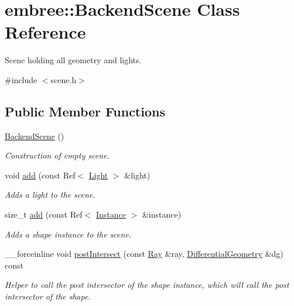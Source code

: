 \hypertarget{classembree_1_1_backend_scene}{
\section{embree::BackendScene Class Reference}
\label{classembree_1_1_backend_scene}
}


Scene holding all geometry and lights.  




{\ttfamily \#include $<$scene.h$>$}

\subsection*{Public Member Functions}
\begin{DoxyCompactItemize}
\item 
\hyperlink{classembree_1_1_backend_scene_aa66132b980de544731db5d8a443d0c8d}{BackendScene} ()
\begin{DoxyCompactList}\small\item\em Construction of empty scene. \item\end{DoxyCompactList}\item 
void \hyperlink{classembree_1_1_backend_scene_a8da0f644c7762164d987f0ce3fe50314}{add} (const Ref$<$ \hyperlink{classembree_1_1_light}{Light} $>$ \&light)
\begin{DoxyCompactList}\small\item\em Adds a light to the scene. \item\end{DoxyCompactList}\item 
size\_\-t \hyperlink{classembree_1_1_backend_scene_a9b0e672d90b8b78226227f7f4ae33d52}{add} (const Ref$<$ \hyperlink{classembree_1_1_instance}{Instance} $>$ \&instance)
\begin{DoxyCompactList}\small\item\em Adds a shape instance to the scene. \item\end{DoxyCompactList}\item 
\_\-\_\-forceinline void \hyperlink{classembree_1_1_backend_scene_a2544ba0397e495d75da9bb285d775db8}{postIntersect} (const \hyperlink{structembree_1_1_ray}{Ray} \&ray, \hyperlink{structembree_1_1_differential_geometry}{DifferentialGeometry} \&dg) const 
\begin{DoxyCompactList}\small\item\em Helper to call the post intersector of the shape instance, which will call the post intersector of the shape. \item\end{DoxyCompactList}\end{DoxyCompactItemize}
